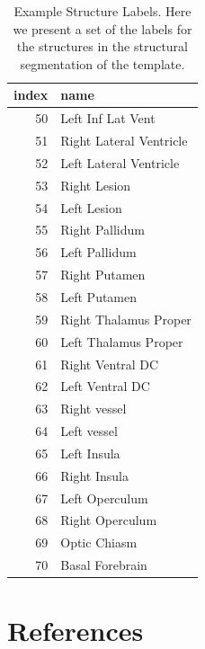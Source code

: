 \documentclass[]{elsarticle} %
\begin{document}
\begin{table}

\caption{\label{tab:labs}Example Structure Labels.  Here we present a set of the labels for the structures in the structural segmentation of the template.}
\centering
\begin{tabular}[t]{r|l}
\hline
index & name\\
\hline
50 & Left Inf Lat Vent\\
\hline
51 & Right Lateral Ventricle\\
\hline
52 & Left Lateral Ventricle\\
\hline
53 & Right Lesion\\
\hline
54 & Left Lesion\\
\hline
55 & Right Pallidum\\
\hline
56 & Left Pallidum\\
\hline
57 & Right Putamen\\
\hline
58 & Left Putamen\\
\hline
59 & Right Thalamus Proper\\
\hline
60 & Left Thalamus Proper\\
\hline
61 & Right Ventral DC\\
\hline
62 & Left Ventral DC\\
\hline
63 & Right vessel\\
\hline
64 & Left vessel\\
\hline
65 & Left Insula\\
\hline
66 & Right Insula\\
\hline
67 & Left Operculum\\
\hline
68 & Right Operculum\\
\hline
69 & Optic Chiasm\\
\hline
70 & Basal Forebrain\\
\hline
\end{tabular}
\end{table}

\hypertarget{references}{%
\section*{References}\label{references}}
\end{document}
